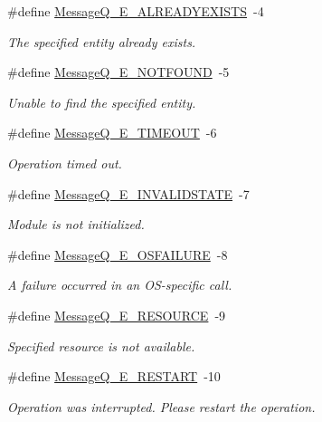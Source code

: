 \begin{DoxyCompactItemize}
\#define \hyperlink{_message_q_8h_ad8d156d79a68fada5951aef246dcda0d}{MessageQ\_\-E\_\-ALREADYEXISTS}~-\/4
\begin{DoxyCompactList}\small\item\em The specified entity already exists. \item\end{DoxyCompactList}\item 
\#define \hyperlink{_message_q_8h_ab629c8afd0ce8a14f60ee791fdb7c3e4}{MessageQ\_\-E\_\-NOTFOUND}~-\/5
\begin{DoxyCompactList}\small\item\em Unable to find the specified entity. \item\end{DoxyCompactList}\item 
\#define \hyperlink{_message_q_8h_a7aa8fb2d3e83b747e767f1c117a657c7}{MessageQ\_\-E\_\-TIMEOUT}~-\/6
\begin{DoxyCompactList}\small\item\em Operation timed out. \item\end{DoxyCompactList}\item 
\#define \hyperlink{_message_q_8h_a52b7b795b2970498c39d71647a11685b}{MessageQ\_\-E\_\-INVALIDSTATE}~-\/7
\begin{DoxyCompactList}\small\item\em Module is not initialized. \item\end{DoxyCompactList}\item 
\#define \hyperlink{_message_q_8h_a8a0891b652f3cd1a15ebdd7a4d030d09}{MessageQ\_\-E\_\-OSFAILURE}~-\/8
\begin{DoxyCompactList}\small\item\em A failure occurred in an OS-\/specific call. \item\end{DoxyCompactList}\item 
\#define \hyperlink{_message_q_8h_af713143259d456df28379635afbbb398}{MessageQ\_\-E\_\-RESOURCE}~-\/9
\begin{DoxyCompactList}\small\item\em Specified resource is not available. \item\end{DoxyCompactList}\item 
\#define \hyperlink{_message_q_8h_a955261f8c7412eab163bff9349591927}{MessageQ\_\-E\_\-RESTART}~-\/10
\begin{DoxyCompactList}\small\item\em Operation was interrupted. Please restart the operation. \item\end{DoxyCompactList}\item 

\end{DoxyCompactItemize}
